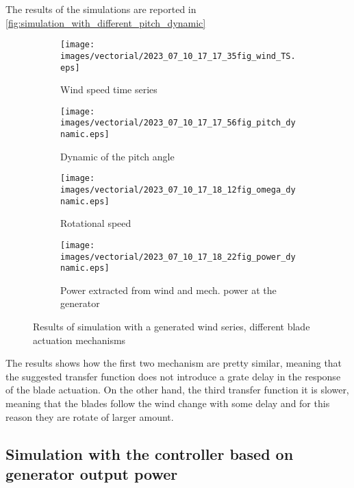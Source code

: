 The results of the simulations are reported in \autoref{fig:simulation_with_different_pitch_dynamic}
\begin{figure}[htb]
  \begin{subfigure}{0.5\columnwidth}
    \centering
    \texttt{[image: images/vectorial/2023\_07\_10\_17\_17\_35fig\_wind\_TS.eps]}
    \caption{Wind speed time series}
    \label{}
  \end{subfigure}
  \begin{subfigure}{0.5\columnwidth}
    \centering
    \texttt{[image: images/vectorial/2023\_07\_10\_17\_17\_56fig\_pitch\_dynamic.eps]}
    \caption{Dynamic of the pitch angle}
    \label{}
  \end{subfigure}
  \begin{subfigure}{0.5\columnwidth}
    \centering
    \texttt{[image: images/vectorial/2023\_07\_10\_17\_18\_12fig\_omega\_dynamic.eps]}
    \caption{Rotational speed}
    \label{}
  \end{subfigure}
  \begin{subfigure}{0.5\columnwidth}
    \centering
    \texttt{[image: images/vectorial/2023\_07\_10\_17\_18\_22fig\_power\_dynamic.eps]}
    \caption{Power extracted from wind and mech. power at the generator}
    \label{}
  \end{subfigure}
  \caption{Results of simulation with a generated wind series, different blade actuation mechanisms}
  \label{fig:simulation_with_different_pitch_dynamic}
\end{figure}
The results shows how the first two mechanism are pretty similar, meaning that the suggested transfer function does not introduce a grate delay in the response of the blade actuation. On the other hand, the third transfer function it is slower, meaning that the blades follow the wind change with some delay and for this reason they are rotate of larger amount.\\

\subsection{Simulation with the controller based on generator output power}\label{subsec:validation_control_P_GE}
